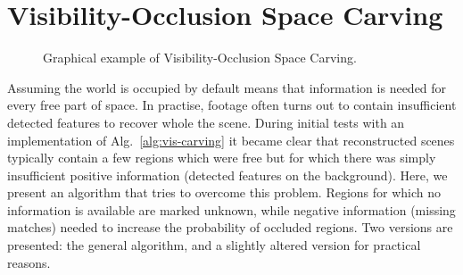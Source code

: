 \section{Visibility-Occlusion Space Carving}  \label{vis-occ-carving}

\begin{figure}[htb!]
 \centering
 \caption{Graphical example of Visibility-Occlusion Space Carving.}
 \label{fig:vis-occ-carving}
\end{figure}

Assuming the world is occupied by default means that information is needed for every free part of space. In practise, footage often turns out to contain insufficient detected features to recover whole the scene. During initial tests with an implementation of Alg.~\ref{alg:vis-carving} it became clear that reconstructed scenes typically contain a few regions which were free but for which there was simply insufficient positive information (\eg detected features on the background). Here, we present an algorithm that tries to overcome this problem. Regions for which no information is available are marked unknown, while negative information (\ie missing matches) needed to increase the probability of occluded regions. Two versions are presented: the general algorithm, and a slightly altered version for practical reasons.

